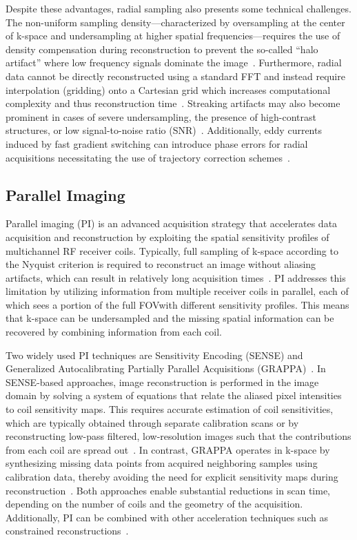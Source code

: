 Despite these advantages, radial sampling also presents some technical challenges. The non-uniform sampling density---characterized by oversampling at the center of k-space and undersampling at higher spatial frequencies---requires the use of density compensation during reconstruction to prevent the so-called ``halo artifact'' where low frequency signals dominate the image~\cite{fesslerNonuniformFastFourier2003}. Furthermore, radial data cannot be directly reconstructed using a standard FFT and instead require interpolation (gridding) onto a Cartesian grid which increases computational complexity and thus reconstruction time~\cite{fesslerNonuniformFastFourier2003}. Streaking artifacts may also become prominent in cases of severe undersampling, the presence of high-contrast structures, or low signal-to-noise ratio (SNR)\@~\cite{fengGoldenAngleRadialMRI2022}. Additionally, eddy currents induced by fast gradient switching can introduce phase errors for radial acquisitions necessitating the use of trajectory correction schemes~\cite{buonincontriTrajectoryCorrectionFreebreathing2014}. 

\subsection{Parallel Imaging}\label{sec:parallel}
Parallel imaging (PI) is an advanced acquisition strategy that accelerates data acquisition and reconstruction by exploiting the spatial sensitivity profiles of multichannel RF receiver coils. Typically, full sampling of k-space according to the Nyquist criterion is required to reconstruct an image without aliasing artifacts, which can result in relatively long acquisition times~\cite{mamourianPracticalMRPhysics2010}. PI addresses this limitation by utilizing information from multiple receiver coils in parallel, each of which sees a portion of the full FOV\@ with different sensitivity profiles. This means that k-space can be undersampled and the missing spatial information can be recovered by combining information from each coil. 

Two widely used PI techniques are Sensitivity Encoding (SENSE) and Generalized Autocalibrating Partially Parallel Acquisitions (GRAPPA)~\cite{blaimerSMASHSENSEPILS2004, pruessmann2001,griswoldPartiallyParallelImaging2000}. In SENSE-based approaches, image reconstruction is performed in the image domain by solving a system of equations that relate the aliased pixel intensities to coil sensitivity maps. This requires accurate estimation of coil sensitivities, which are typically obtained through separate calibration scans or by reconstructing low-pass filtered, low-resolution images such that the contributions from each coil are spread out~\cite{pruessmann2001}. In contrast, GRAPPA operates in k-space by synthesizing missing data points from acquired neighboring samples using calibration data, thereby avoiding the need for explicit sensitivity maps during reconstruction~\cite{griswoldGeneralizedAutocalibratingPartially2002}. Both approaches enable substantial reductions in scan time, depending on the number of coils and the geometry of the acquisition. Additionally, PI can be combined with other acceleration techniques such as constrained reconstructions~\cite{blaimerSMASHSENSEPILS2004}.

